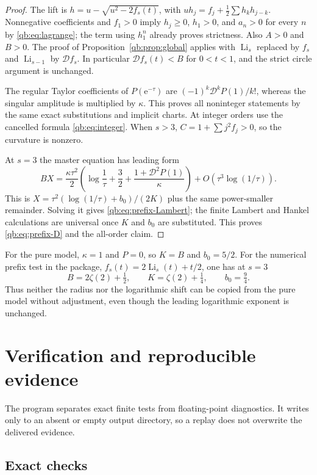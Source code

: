 \documentclass[11pt,a4paper]{article}
\theoremstyle{definition}\newtheorem{definition}[theorem]{Definition}
\theoremstyle{remark}\newtheorem{remark}[theorem]{Remark}
\newcommand{\Li}{\operatorname{Li}}
\newcommand{\ee}{\mathrm e}
\newcommand{\Dop}{\mathcal D}
\numberwithin{equation}{section}
\begin{document}
\begin{proof}
The lift is $h=u-\sqrt{u^2-2f_s(t)}$, with
$uh_j=f_j+\tfrac12\sum h_kh_{j-k}$. Nonnegative coefficients and
$f_1>0$ imply $h_j\ge0$, $h_1>0$, and $a_n>0$ for every $n$ by
\eqref{qb:eq:lagrange}; the term using $h_1^n$ already proves strictness.
Also $A>0$ and $B>0$. The proof of
Proposition~\ref{qb:prop:global} applies with $\Li_s$ replaced by
$f_s$ and $\Li_{s-1}$ by $\Dop f_s$. In particular
$\Dop f_s(t)<B$ for $0<t<1$, and the strict circle argument is unchanged.

The regular Taylor coefficients of $P(\ee^{-\tau})$ are
$(-1)^k\Dop^kP(1)/k!$, whereas the singular amplitude is multiplied by
$\kappa$. This proves all noninteger statements by the same exact
substitutions and implicit charts. At integer orders use the cancelled
formula \eqref{qb:eq:integer}. When $s>3$, $C=1+\sum j^2f_j>0$,
so the curvature is nonzero.

At $s=3$ the master equation has leading form
\[
 BX=\frac{\kappa\tau^2}{2}
 \left(\log\frac1\tau+\frac32+
                  \frac{1+\Dop^2P(1)}\kappa\right)
 +O(\tau^3\log(1/\tau)).
\]
This is $X=\tau^2(\log(1/\tau)+b_0)/(2K)$ plus the same
power-smaller remainder. Solving it gives
\eqref{qb:eq:prefix-Lambert}; the finite Lambert and Hankel calculations
are universal once $K$ and $b_0$ are substituted. This proves
\eqref{qb:eq:prefix-D} and the all-order claim.
\end{proof}

For the pure model, $\kappa=1$ and $P=0$, so $K=B$ and $b_0=5/2$.
For the numerical prefix test in the package,
$f_s(t)=2\Li_s(t)+t/2$, one has at $s=3$
\[
 B=2\zeta(2)+\tfrac12,\qquad K=\zeta(2)+\tfrac14,
 \qquad b_0=\tfrac94.
\]
Thus neither the radius nor the logarithmic shift can be copied from the
pure model without adjustment, even though the leading logarithmic
exponent is unchanged.

\section{Verification and reproducible evidence}\label{qb:sec:verification}

The program  separates exact finite tests from
floating-point diagnostics. It writes only to an absent or empty output
directory, so a replay does not overwrite the delivered evidence.

\subsection{Exact checks}
\end{document}
